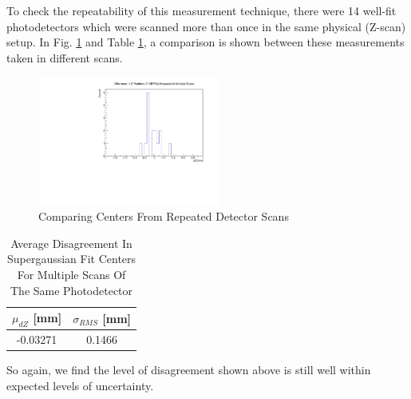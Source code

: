 To check the repeatability of this measurement technique, there were 14 well-fit photodetectors which were scanned more than once in the same physical (Z-scan) setup. In  Fig. \ref{fig:repzmeas} and Table \ref{tab:mulitscandz}, a comparison is shown between these measurements taken in different scans.
\begin{figure}[H]
    \centering
    \includegraphics[width=6cm]{graphics/repdzbnostats.pdf}
    \caption{Comparing Centers From Repeated Detector Scans}
    \label{fig:repzmeas}
\end{figure}
\begin{table}[H]
    \centering
    \begin{tabular}{c|c}
        $\mu_{dZ}$ [mm]& $\sigma_{RMS}$ [mm]  \\
        \hline
        -0.03271 & 0.1466
    \end{tabular}
    \caption{Average Disagreement In Supergaussian Fit Centers For Multiple Scans Of The Same Photodetector}
    \label{tab:mulitscandz}
\end{table}
\noindent 
So again, we find the level of disagreement shown above is still well within expected levels of uncertainty.

